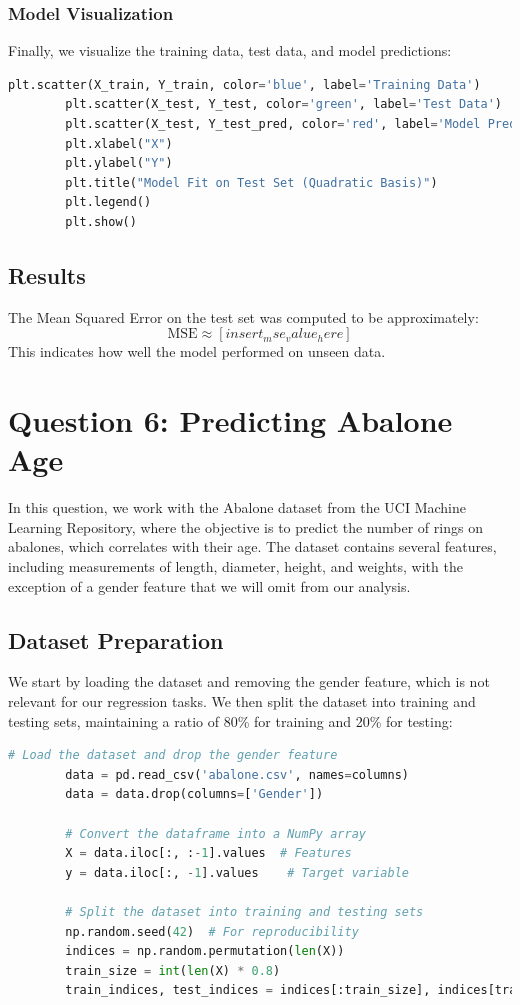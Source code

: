 \documentclass{article}
\begin{document}
	\subsubsection*{Model Visualization}
	Finally, we visualize the training data, test data, and model predictions:
	\begin{lstlisting}[language=Python]
		plt.scatter(X_train, Y_train, color='blue', label='Training Data')
		plt.scatter(X_test, Y_test, color='green', label='Test Data')
		plt.scatter(X_test, Y_test_pred, color='red', label='Model Predictions')
		plt.xlabel("X")
		plt.ylabel("Y")
		plt.title("Model Fit on Test Set (Quadratic Basis)")
		plt.legend()
		plt.show()
	\end{lstlisting}
	
	\subsection*{Results}
	The Mean Squared Error on the test set was computed to be approximately: 
	\[
	\text{MSE} \approx [insert_mse_value_here]
	\]
	This indicates how well the model performed on unseen data.
	
	
	
	\section*{Question 6: Predicting Abalone Age}
	
	In this question, we work with the Abalone dataset from the UCI Machine Learning Repository, where the objective is to predict the number of rings on abalones, which correlates with their age. The dataset contains several features, including measurements of length, diameter, height, and weights, with the exception of a gender feature that we will omit from our analysis.
	
	\subsection*{Dataset Preparation}
	We start by loading the dataset and removing the gender feature, which is not relevant for our regression tasks. We then split the dataset into training and testing sets, maintaining a ratio of 80\% for training and 20\% for testing:
	\begin{lstlisting}[language=Python]
		# Load the dataset and drop the gender feature
		data = pd.read_csv('abalone.csv', names=columns)
		data = data.drop(columns=['Gender'])
		
		# Convert the dataframe into a NumPy array
		X = data.iloc[:, :-1].values  # Features
		y = data.iloc[:, -1].values    # Target variable
		
		# Split the dataset into training and testing sets
		np.random.seed(42)  # For reproducibility
		indices = np.random.permutation(len(X))
		train_size = int(len(X) * 0.8)
		train_indices, test_indices = indices[:train_size], indices[train_size:]
	\end{lstlisting}
	
\end{document}
